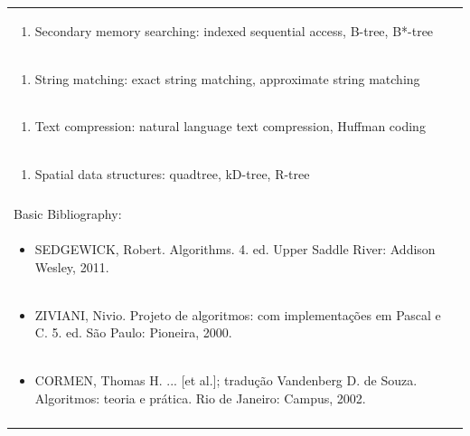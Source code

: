 \documentclass[11pt]{article}
\begin{document}
\begin{center}
\begin{longtable}{|p{4cm}|p{4cm}|p{4cm}|p{4cm}|}
\multicolumn{4}{|p{\dimexpr 16cm + 6\tabcolsep\relax}|}{\begin{enumerate}[start=3]\item Secondary memory searching: indexed sequential access, B-tree, B*-tree\end{enumerate}}\\
\multicolumn{4}{|p{\dimexpr 16cm + 6\tabcolsep\relax}|}{\begin{enumerate}[start=4]\item String matching: exact string matching, approximate string matching\end{enumerate}}\\
\multicolumn{4}{|p{\dimexpr 16cm + 6\tabcolsep\relax}|}{\begin{enumerate}[start=5]\item Text compression: natural language text compression, Huffman coding\end{enumerate}}\\
\multicolumn{4}{|p{\dimexpr 16cm + 6\tabcolsep\relax}|}{\begin{enumerate}[start=6]\item Spatial data structures: quadtree, kD-tree, R-tree\end{enumerate}}\\
\multicolumn{4}{|p{\dimexpr 16cm + 6\tabcolsep\relax}|}{}\\
\hline
\multicolumn{4}{|p{16cm}|}{Basic Bibliography:}\\*
\multicolumn{4}{|p{\dimexpr 16cm + 6\tabcolsep\relax}|}{\begin{itemize}\item SEDGEWICK, Robert. Algorithms. 4. ed. Upper Saddle River: Addison Wesley, 2011.\end{itemize}}\\
\multicolumn{4}{|p{\dimexpr 16cm + 6\tabcolsep\relax}|}{\begin{itemize}\item ZIVIANI, Nivio. Projeto de algoritmos: com implementações em Pascal e C. 5. ed. São Paulo: Pioneira, 2000.\end{itemize}}\\
\multicolumn{4}{|p{\dimexpr 16cm + 6\tabcolsep\relax}|}{\begin{itemize}\item CORMEN, Thomas H. ... [et al.]; tradução Vandenberg D. de Souza. Algoritmos: teoria e prática. Rio de Janeiro: Campus, 2002.\end{itemize}}\\
\multicolumn{4}{|p{16cm}|}{}\\

\end{longtable}
\end{center}
\end{document}
